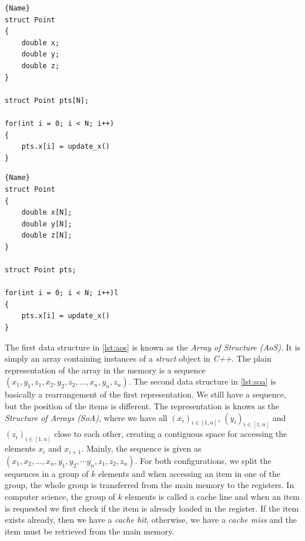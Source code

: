 \begin{minipage}{.45\textwidth}
\begin{lstlisting}[caption=Array of Structure (AoS),frame=tlrb, label=lst:aos]{Name}
struct Point
{
    double x;
    double y;
    double z;
}

struct Point pts[N];

for(int i = 0; i < N; i++)
{
    pts.x[i] = update_x()
}
\end{lstlisting}
\end{minipage}\hfill
\begin{minipage}{.45\textwidth}
\begin{lstlisting}[caption=Structure of Arrays (SoA),frame=tlrb, label=lst:soa]{Name}
struct Point
{
    double x[N];
    double y[N];
    double z[N];
}

struct Point pts;

for(int i = 0; i < N; i++)l
{
    pts.x[i] = update_x()
}

\end{lstlisting}
\end{minipage}

The first data structure in \autoref{lst:aos} is known as the \emph{Array of Structure (AoS)}. It is simply an array containing instances of a \emph{struct} object in \emph{C++}. The plain representation of the array in the memory is a sequence $(x_1, y_1, z_1, x_2, y_2, z_2, \dots, x_n, y_n, z_n)$. The second data structure in \autoref{lst:soa} is basically a rearrangement of the first representation. We still have a sequence, but the position of the items is different. The representation is knows as the \emph{Structure of Arrays (SoA)}, where we have all $(x_i)_{i \in[1, n]}$, $(y_i)_{i \in[1, n]}$ and $(z_i)_{i \in[1, n]}$ close to each other, creating a contiguous space for accessing the elements $x_i$ and $x_{i+1}$. Mainly, the sequence is given as $(x_1, x_{2}, \dots, x_n, y_1, y_{2}, \cdots y_{n}, z_1, z_2, z_n)$.  For both configurations, we split the sequences in a group of $k$ elements and when accessing an item in one of the group, the whole group is transferred from the main memory to the registers. In computer science, the group of $k$ elements is called a cache line and when an item is requested we first check if the item is already loaded in the register. If the item exists already, then we have a \emph{cache hit}, otherwise, we have a \emph{cache miss} and the item must be retrieved from the main memory.

